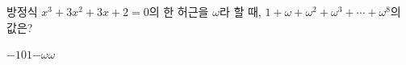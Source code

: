 방정식 $x^3+3x^2+3x+2=0$의 한 허근을 $\omega$라 할 때, $1+\omega+\omega^2+\omega^3+\cdots+\omega^8$의 값은?
\begin{choices32}{$-1$}{$0$}{$1$}{$-\omega$}{$\omega$}\end{choices32}
